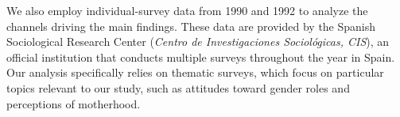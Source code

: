 \documentclass[a4paper,oneside,final,onecolumn,11pt,english]{article}
\begin{document}
We also employ individual-survey data from 1990 and 1992 to analyze the channels driving the main findings. These data are provided by the Spanish Sociological Research Center (\textit{Centro de Investigaciones Sociol\'ogicas, CIS}), an official institution that conducts multiple surveys throughout the year in Spain.  Our analysis specifically relies on thematic surveys, which focus on particular topics relevant to our study, such as attitudes toward gender roles and perceptions of motherhood.

 

\clearpage
\printbibliography
\end{document}
